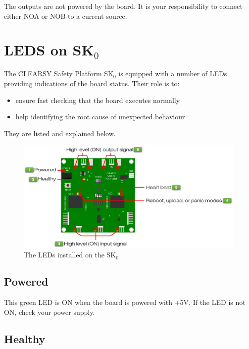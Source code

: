 The outputs are not powered by the board. It is your responsibility to connect either NOA or NOB to a current source.



\chapter{LEDS on SK$_0$}


The CLEARSY Safety Platform SK$_0$ is equipped with a number of LEDs providing indications of the board status. Their role is to:
\begin{itemize}
    \item ensure fast checking that the board executes normally
    \item help identifying the root cause of unexpected behaviour
\end{itemize}
 They are listed and explained below.

\begin{figure}[h]
\centering\includegraphics[scale=0.28]{Pictures/chapterAnnexes/SK0-lights.png}
\caption{The LEDs installed on the SK$_0$}
\label{annexes:SK0-HW-light}
\end{figure}

\section{Powered}

This green LED is ON when the board is powered with +5V.
If the LED is not ON, check your power supply.

\section{Healthy}

